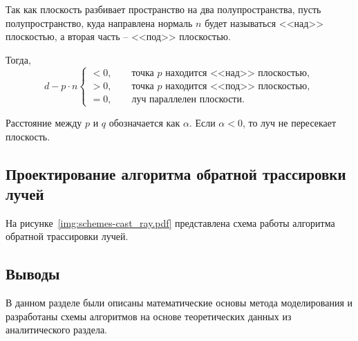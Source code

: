Так как плоскость разбивает пространство на два полупространства, пусть полупространство, куда направлена нормаль $n$ будет называться <<над>> плоскостью, а вторая часть -- <<под>> плоскостью.

Тогда,
\begin{equation}
	d - p\cdot n \begin{cases}
		< 0,\qquad \text{точка $p$ находится <<над>> плоскостью},\\ 
		> 0,\qquad \text{точка $p$ находится <<под>> плоскостью},\\
		= 0,\qquad \text{луч параллелен плоскости}.
	\end{cases}
\end{equation}

Расстояние между $p$ и $q$ обозначается как $\alpha$. Если $\alpha < 0$, то луч не пересекает плоскость.

\newpage
\subsection{Проектирование алгоритма обратной трассировки лучей}
На рисунке~\ref{img:schemes-cast_ray.pdf} представлена схема работы алгоритма обратной трассировки лучей. 

\subsection*{Выводы}
В данном разделе были описаны математические основы метода моделирования и разработаны схемы алгоритмов на основе теоретических данных из аналитического раздела.


\newpage